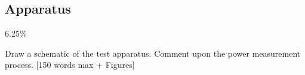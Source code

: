 \subsection{Apparatus}
\label{sec:test:apparatus}

6.25\%

Draw a schematic of the test apparatus. Comment upon the power measurement process. [150 words max + Figures]
